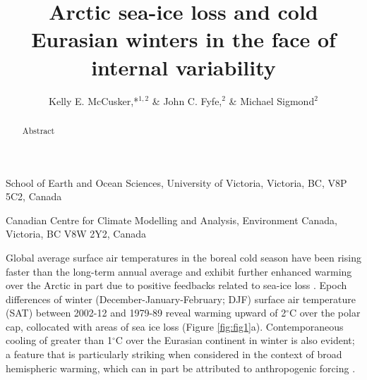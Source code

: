 \documentclass{nature}
\title{Arctic sea-ice loss and cold Eurasian winters in the face of internal variability}%
\author{Kelly E. McCusker,*$^{1,2}$ \& John C. Fyfe,$^{2}$ \& Michael Sigmond$^2$}
\begin{document}
\maketitle

\begin{affiliations}
 \item School of Earth and Ocean Sciences, University of Victoria, Victoria, BC, V8P 5C2, Canada
 \item Canadian Centre for Climate Modelling and Analysis, Environment Canada, Victoria, BC V8W 2Y2, Canada
\end{affiliations}


\begin{abstract}
Abstract %
\end{abstract}

Global average surface air temperatures in the boreal cold season have been rising faster than the long-term annual average \cite{wallace12} and exhibit further enhanced warming over the Arctic in part due to positive feedbacks related to sea-ice loss \cite{screen10,cohen14}. Epoch differences of winter (December-January-February; DJF) surface air temperature (SAT) between 2002-12 and 1979-89 reveal warming upward of 2$^\circ$C over the polar cap, collocated with areas of sea ice loss (Figure \ref{fig:fig1}a). Contemporaneous cooling of greater than 1$^\circ$C over the Eurasian continent in winter is also evident; a feature that is particularly striking when considered in the context of broad hemispheric warming, which can in part be attributed to anthropogenic forcing \cite{gillett08,qian15}. 
\end{document}
